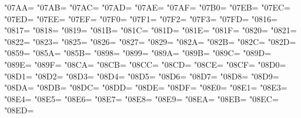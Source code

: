 \XeTeXcharclass"07AA=\KclassCM
\XeTeXcharclass"07AB=\KclassCM
\XeTeXcharclass"07AC=\KclassCM
\XeTeXcharclass"07AD=\KclassCM
\XeTeXcharclass"07AE=\KclassCM
\XeTeXcharclass"07AF=\KclassCM
\XeTeXcharclass"07B0=\KclassCM
\XeTeXcharclass"07EB=\KclassCM
\XeTeXcharclass"07EC=\KclassCM
\XeTeXcharclass"07ED=\KclassCM
\XeTeXcharclass"07EE=\KclassCM
\XeTeXcharclass"07EF=\KclassCM
\XeTeXcharclass"07F0=\KclassCM
\XeTeXcharclass"07F1=\KclassCM
\XeTeXcharclass"07F2=\KclassCM
\XeTeXcharclass"07F3=\KclassCM
\XeTeXcharclass"07FD=\KclassCM
\XeTeXcharclass"0816=\KclassCM
\XeTeXcharclass"0817=\KclassCM
\XeTeXcharclass"0818=\KclassCM
\XeTeXcharclass"0819=\KclassCM
\XeTeXcharclass"081B=\KclassCM
\XeTeXcharclass"081C=\KclassCM
\XeTeXcharclass"081D=\KclassCM
\XeTeXcharclass"081E=\KclassCM
\XeTeXcharclass"081F=\KclassCM
\XeTeXcharclass"0820=\KclassCM
\XeTeXcharclass"0821=\KclassCM
\XeTeXcharclass"0822=\KclassCM
\XeTeXcharclass"0823=\KclassCM
\XeTeXcharclass"0825=\KclassCM
\XeTeXcharclass"0826=\KclassCM
\XeTeXcharclass"0827=\KclassCM
\XeTeXcharclass"0829=\KclassCM
\XeTeXcharclass"082A=\KclassCM
\XeTeXcharclass"082B=\KclassCM
\XeTeXcharclass"082C=\KclassCM
\XeTeXcharclass"082D=\KclassCM
\XeTeXcharclass"0859=\KclassCM
\XeTeXcharclass"085A=\KclassCM
\XeTeXcharclass"085B=\KclassCM
\XeTeXcharclass"0898=\KclassCM
\XeTeXcharclass"0899=\KclassCM
\XeTeXcharclass"089A=\KclassCM
\XeTeXcharclass"089B=\KclassCM
\XeTeXcharclass"089C=\KclassCM
\XeTeXcharclass"089D=\KclassCM
\XeTeXcharclass"089E=\KclassCM
\XeTeXcharclass"089F=\KclassCM
\XeTeXcharclass"08CA=\KclassCM
\XeTeXcharclass"08CB=\KclassCM
\XeTeXcharclass"08CC=\KclassCM
\XeTeXcharclass"08CD=\KclassCM
\XeTeXcharclass"08CE=\KclassCM
\XeTeXcharclass"08CF=\KclassCM
\XeTeXcharclass"08D0=\KclassCM
\XeTeXcharclass"08D1=\KclassCM
\XeTeXcharclass"08D2=\KclassCM
\XeTeXcharclass"08D3=\KclassCM
\XeTeXcharclass"08D4=\KclassCM
\XeTeXcharclass"08D5=\KclassCM
\XeTeXcharclass"08D6=\KclassCM
\XeTeXcharclass"08D7=\KclassCM
\XeTeXcharclass"08D8=\KclassCM
\XeTeXcharclass"08D9=\KclassCM
\XeTeXcharclass"08DA=\KclassCM
\XeTeXcharclass"08DB=\KclassCM
\XeTeXcharclass"08DC=\KclassCM
\XeTeXcharclass"08DD=\KclassCM
\XeTeXcharclass"08DE=\KclassCM
\XeTeXcharclass"08DF=\KclassCM
\XeTeXcharclass"08E0=\KclassCM
\XeTeXcharclass"08E1=\KclassCM
\XeTeXcharclass"08E3=\KclassCM
\XeTeXcharclass"08E4=\KclassCM
\XeTeXcharclass"08E5=\KclassCM
\XeTeXcharclass"08E6=\KclassCM
\XeTeXcharclass"08E7=\KclassCM
\XeTeXcharclass"08E8=\KclassCM
\XeTeXcharclass"08E9=\KclassCM
\XeTeXcharclass"08EA=\KclassCM
\XeTeXcharclass"08EB=\KclassCM
\XeTeXcharclass"08EC=\KclassCM
\XeTeXcharclass"08ED=\KclassCM
